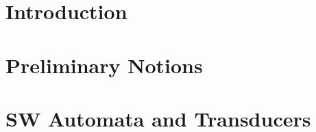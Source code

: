 \thispagestyle{empty}
\maketitle

\begin{abstract}

\end{abstract}




\section{Introduction} \label{sec:intro}




\section{Preliminary Notions}
\label{section:prelim}\label{sec:prelim}


\label{section:semiring}\label{sec:semiring}


\label{section:symbols}





\section{SW Automata and Transducers}
\label{section:transducer}\label{sec:transducer}
\label{section:SWA}\label{sec:SWA}
\label{section:SWT}\label{sec:SWT}

